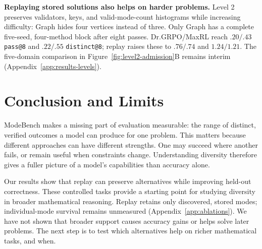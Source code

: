 \noindent\textbf{Replaying stored solutions also helps on harder problems.}
\label{sec:results-levels}
Level 2 preserves validators, keys, and valid-mode-count histograms while
increasing difficulty: Graph hides four vertices instead of three.
Only Graph has a complete five-seed, four-method block after eight passes.
Dr.GRPO/MaxRL reach $.20/.43$ \texttt{pass@8} and $.22/.55$
\texttt{distinct@8}; replay raises these to $.76/.74$ and $1.24/1.21$.
The five-domain comparison in Figure~\ref{fig:level2-admission}B remains interim
(Appendix~\ref{app:results-levels}).

\section{Conclusion and Limits}
\label{sec:conclusion}\label{sec:discussion}\label{sec:limitations}
ModeBench makes a missing part of evaluation measurable: the range of distinct,
verified outcomes a model can produce for one problem. This matters because
different approaches can have different strengths. One may succeed where
another fails, or remain useful when constraints change. Understanding diversity
therefore gives a fuller picture of a model's capabilities than accuracy alone.

Our results show that replay can preserve alternatives while improving
held-out correctness. These controlled tasks provide a starting point for
studying diversity in broader mathematical reasoning. Replay retains only discovered,
stored modes; individual-mode survival remains unmeasured
(Appendix~\ref{app:ablations}). We have not shown that broader support causes
accuracy gains or helps solve later problems. The next step is to test which
alternatives help on richer mathematical tasks, and when.

\label{main:lastpage}
\clearpage


\clearpage
\appendix


